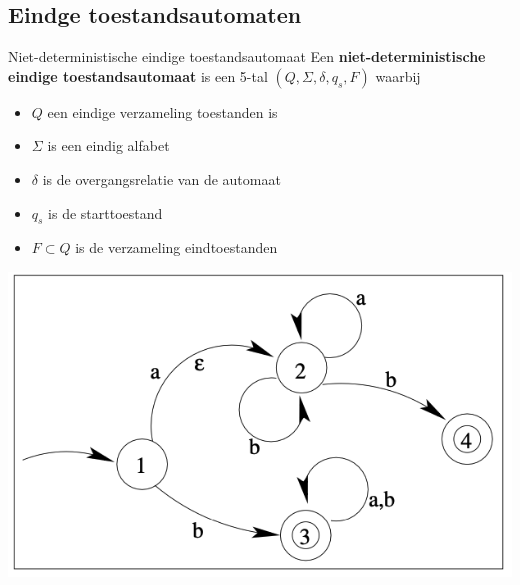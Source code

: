 \subsection{Eindge toestandsautomaten}

\vspace{0.5cm}

\begin{theo}{Niet-deterministische eindige toestandsautomaat}
    Een \textbf{niet-deterministische eindige toestandsautomaat} is een 5-tal $(Q,\Sigma, \delta, q_s, F)$ waarbij

    \vspace{0.5cm}

    \begin{minipage}{.56\textwidth}
        \begin{itemize}
            \item $Q$ een eindige verzameling toestanden is
            \item $\Sigma$ is een eindig alfabet
            \item $\delta$ is de overgangsrelatie van de automaat
            \item $q_s$ is de starttoestand
            \item $F \subset Q$ is de verzameling eindtoestanden
        \end{itemize}
    \end{minipage}
    \begin{minipage}{.4\textwidth}
        \begin{center}
            \includegraphics[scale = 0.275]{Images/NFA}
        \end{center}
    \end{minipage}
\end{theo}

